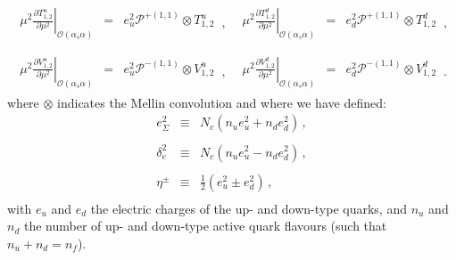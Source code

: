 \begin{equation}
\begin{array}{ll}
\begin{array}{rcl}
\displaystyle \left.\mu^2\frac{\partial T^u_{1,2}}{\partial \mu^2}\right|_{\mathcal{O}(\alpha_s \alpha)} &=&
\displaystyle e_u^2\mathcal{P}^{+(1,1)}\otimes T^u_{1,2}
\end{array}\,, &
\begin{array}{rcl}
\displaystyle \left.\mu^2\frac{\partial T^d_{1,2}}{\partial \mu^2}\right|_{\mathcal{O}(\alpha_s \alpha)} &=&
\displaystyle e_d^2\mathcal{P}^{+(1,1)} \otimes T^d_{1,2}
\end{array}\,,
\\
\\
\begin{array}{rcl}
\displaystyle \left.\mu^2\frac{\partial V^u_{1,2}}{\partial \mu^2}\right|_{\mathcal{O}(\alpha_s \alpha)} &=&
\displaystyle e_u^2\mathcal{P}^{-(1,1)} \otimes V^u_{1,2}
\end{array}\,, &
\begin{array}{rcl}
\displaystyle \left.\mu^2\frac{\partial V^d_{1,2}}{\partial \mu^2}\right|_{\mathcal{O}(\alpha_s \alpha)} &=&
\displaystyle e_d^2\mathcal{P}^{-(1,1)}\otimes V^d_{1,2}
\end{array}\,.
\end{array}
\end{equation}
where $\otimes$ indicates the Mellin convolution and where we have
defined:
\begin{equation}
\begin{array}{rcl}
e_{\Sigma}^{2}& \equiv &\displaystyle
N_c(n_ue_{u}^{2}+n_de_{d}^{2})\,,\\
\\
\delta_e^2 & \equiv &\displaystyle N_c(n_u e_u^2 -n_d e_d^2)\,,\\
\\
\eta^{\pm} & \equiv & \displaystyle \frac{1}{2}\left(e_{u}^{2}\pm
  e_{d}^{2}\right)\,,\\
\end{array}
\end{equation}
with $e_u$ and $e_d$ the electric charges of the up- and down-type
quarks, and $n_u$ and $n_d$ the number of up- and down-type active
quark flavours (such that $n_u+n_d=n_f$).
%

